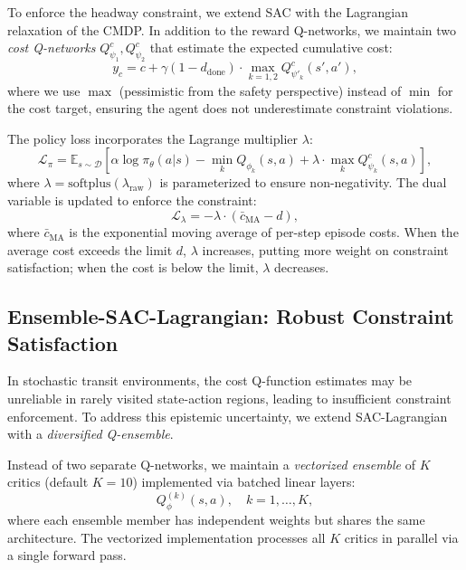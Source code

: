 \documentclass[10pt]{article}
\begin{document}
To enforce the headway constraint, we extend SAC with the Lagrangian relaxation of the CMDP. In addition to the reward Q-networks, we maintain two \emph{cost Q-networks} $Q^c_{\psi_1}, Q^c_{\psi_2}$ that estimate the expected cumulative cost:
\begin{equation}
    y_c = c + \gamma (1 - d_{\text{done}}) \cdot \max_{k=1,2} Q^c_{\psi'_k}(s', a'),
    \label{eq:cost_target}
\end{equation}
where we use $\max$ (pessimistic from the safety perspective) instead of $\min$ for the cost target, ensuring the agent does not underestimate constraint violations.

The policy loss incorporates the Lagrange multiplier $\lambda$:
\begin{equation}
    \mathcal{L}_\pi = \mathbb{E}_{s \sim \mathcal{D}} \left[ \alpha \log \pi_\theta(a|s) - \min_{k} Q_{\phi_k}(s, a) + \lambda \cdot \max_{k} Q^c_{\psi_k}(s, a) \right],
    \label{eq:policy_loss_lag}
\end{equation}
where $\lambda = \text{softplus}(\lambda_{\text{raw}})$ is parameterized to ensure non-negativity. The dual variable is updated to enforce the constraint:
\begin{equation}
    \mathcal{L}_\lambda = -\lambda \cdot (\bar{c}_{\text{MA}} - d),
    \label{eq:lambda_loss}
\end{equation}
where $\bar{c}_{\text{MA}}$ is the exponential moving average of per-step episode costs. When the average cost exceeds the limit $d$, $\lambda$ increases, putting more weight on constraint satisfaction; when the cost is below the limit, $\lambda$ decreases.

\subsection{Ensemble-SAC-Lagrangian: Robust Constraint Satisfaction}

In stochastic transit environments, the cost Q-function estimates may be unreliable in rarely visited state-action regions, leading to insufficient constraint enforcement. To address this epistemic uncertainty, we extend SAC-Lagrangian with a \emph{diversified Q-ensemble}.

Instead of two separate Q-networks, we maintain a \emph{vectorized ensemble} of $K$ critics (default $K=10$) implemented via batched linear layers:
\begin{equation}
    Q_{\phi}^{(k)}(s, a), \quad k = 1, \ldots, K,
\end{equation}
where each ensemble member has independent weights but shares the same architecture. The vectorized implementation processes all $K$ critics in parallel via a single forward pass.
\end{document}
